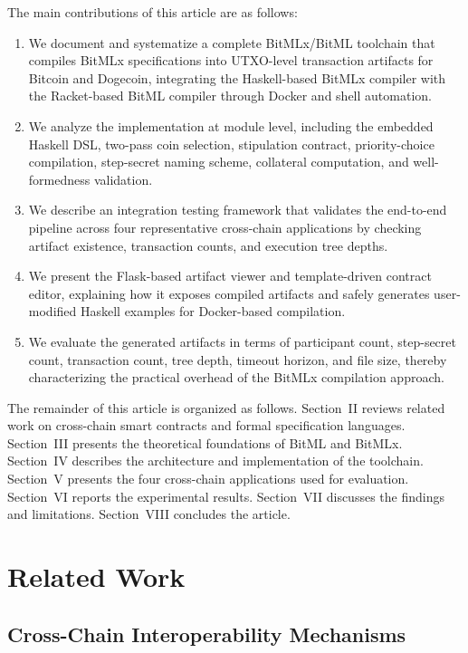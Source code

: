 \documentclass[journal]{IEEEtran}
\begin{document}
The main contributions of this article are as follows:
\begin{enumerate}
\item We document and systematize a complete BitMLx/BitML toolchain that compiles BitMLx specifications into UTXO-level transaction artifacts for Bitcoin and Dogecoin, integrating the Haskell-based BitMLx compiler with the Racket-based BitML compiler through Docker and shell automation.
\item We analyze the implementation at module level, including the embedded Haskell DSL, two-pass coin selection, stipulation contract, priority-choice compilation, step-secret naming scheme, collateral computation, and well-formedness validation.
\item We describe an integration testing framework that validates the end-to-end pipeline across four representative cross-chain applications by checking artifact existence, transaction counts, and execution tree depths.
\item We present the Flask-based artifact viewer and template-driven contract editor, explaining how it exposes compiled artifacts and safely generates user-modified Haskell examples for Docker-based compilation.
\item We evaluate the generated artifacts in terms of participant count, step-secret count, transaction count, tree depth, timeout horizon, and file size, thereby characterizing the practical overhead of the BitMLx compilation approach.
\end{enumerate}

The remainder of this article is organized as follows. Section~II reviews related work on cross-chain smart contracts and formal specification languages. Section~III presents the theoretical foundations of BitML and BitMLx. Section~IV describes the architecture and implementation of the toolchain. Section~V presents the four cross-chain applications used for evaluation. Section~VI reports the experimental results. Section~VII discusses the findings and limitations. Section~VIII concludes the article.

\section{Related Work}

\subsection{Cross-Chain Interoperability Mechanisms}
\end{document}

